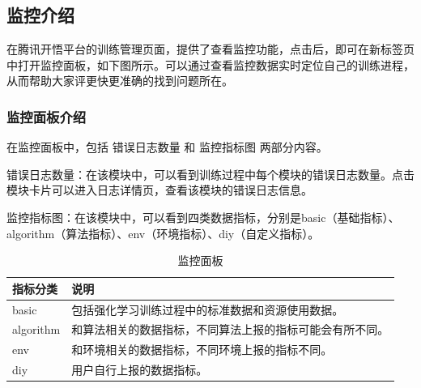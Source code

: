 \subsection{监控介绍}

在腾讯开悟平台的训练管理页面，提供了查看监控功能，点击后，即可在新标签页中打开监控面板，如下图所示。可以通过查看监控数据实时定位自己的训练进程，从而帮助大家评更快更准确的找到问题所在。

\subsubsection{监控面板介绍}

在监控面板中，包括 错误日志数量 和 监控指标图 两部分内容。

错误日志数量：在该模块中，可以看到训练过程中每个模块的错误日志数量。点击模块卡片可以进入日志详情页，查看该模块的错误日志信息。

监控指标图：在该模块中，可以看到四类数据指标，分别是basic（基础指标）、algorithm（算法指标）、env（环境指标）、diy（自定义指标）。

\begin{table}[H]
    \begin{tabularx}{1\textwidth}{ l X } %
        \hline %
        \textbf{指标分类} & \textbf{说明}  \\
        \hline
        basic&包括强化学习训练过程中的标准数据和资源使用数据。\\
        algorithm&和算法相关的数据指标，不同算法上报的指标可能会有所不同。\\
        env&和环境相关的数据指标，不同环境上报的指标不同。\\
        diy&用户自行上报的数据指标。\\
        \hline
    \end{tabularx}

    \centering
    \caption{监控面板}
    \label{monitor-dashboard}
\end{table}


